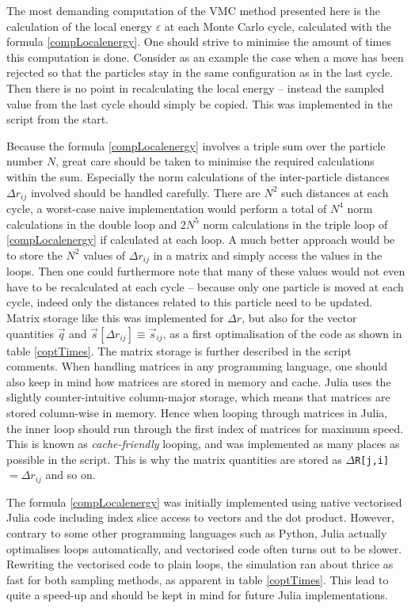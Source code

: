 \documentclass[a4paper,8pt]{article}
\begin{document}
\begin{multicols}{2}
The most demanding computation of the VMC method presented here is the calculation of the local energy $\varepsilon$ at each Monte Carlo cycle, calculated with the formula \eqref{compLocalenergy}. One should strive to minimise the amount of times this computation is done. Consider as an example the case when a move has been rejected so that the particles stay in the same configuration as in the last cycle. Then there is no point in recalculating the local energy -- instead the sampled value from the last cycle should simply be copied. This was implemented in the script from the start. 

Because the formula \eqref{compLocalenergy} involves a triple sum over the particle number $N$, great care should be taken to minimise the required calculations within the sum. Especially the norm calculations of the inter-particle distances $\Delta r_{ij}$ involved should be handled carefully. There are $N^2$ such distances at each cycle, a worst-case naive implementation would perform a total of $N^4$ norm calculations in the double loop and $2N^5$ norm calculations in the triple loop of \eqref{compLocalenergy} if calculated at each loop. A much better approach would be to store the $N^2$ values of $\Delta r_{ij}$ in a matrix and simply access the values in the loops. Then one could furthermore note that many of these values would not even have to be recalculated at each cycle -- because only one particle is moved at each cycle, indeed only the distances related to this particle need to be updated. Matrix storage like this was implemented for $\Delta r$, but also for the vector quantities $\vec{q}$ and $\vec{s}[\Delta r_{ij}] \equiv \vec{s}_{ij}$, as a first optimalisation of the code as shown in table \ref{coptTimes}. The matrix storage is further described in the script comments. When handling matrices in any programming language, one should also keep in mind how matrices are stored in memory and cache. Julia uses the slightly counter-intuitive column-major storage, which means that matrices are stored column-wise in memory. Hence when looping through matrices in Julia, the inner loop should run through the first index of matrices for maximum speed. This is known as \textit{cache-friendly} looping, and was implemented as many places as possible in the script. This is why the matrix quantities are stored as \texttt{$\Delta$R[j,i]}$ = \Delta{r}_{ij}$ and so on.

The formula \eqref{compLocalenergy} was initially implemented using native vectorised Julia code including index slice access to vectors and the dot product. However, contrary to some other programming languages such as Python, Julia actually optimalises loops automatically, and vectorised code often turns out to be slower. Rewriting the vectorised code to plain loops, the simulation ran about thrice as fast for both sampling methods, as apparent in table \ref{coptTimes}. This lead to quite a speed-up and should be kept in mind for future Julia implementations.


\end{multicols}
\end{document}
